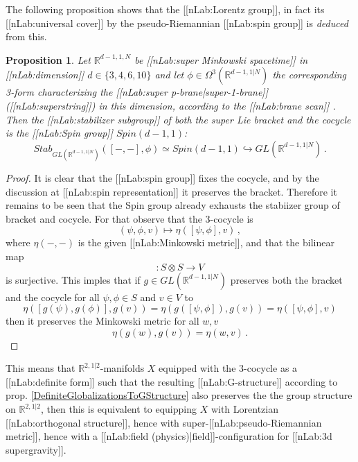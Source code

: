 \documentclass[12pt,titlepage]{article}
\theoremstyle{plain}
\newtheorem{prop}{Proposition}
\theoremstyle{definition}
\theoremstyle{remark}
\begin{document}
The following proposition shows that the [[nLab:Lorentz group]], in fact its [[nLab:universal cover]] by the pseudo-Riemannian [[nLab:spin group]] is \emph{deduced} from this.
\begin{prop}
\label{StabilizerOfSupersymmetryJointWith3Cocycle}\hypertarget{StabilizerOfSupersymmetryJointWith3Cocycle}{}
Let $\mathbb{R}^{d-1,1,N}$ be [[nLab:super Minkowski spacetime]] in [[nLab:dimension]] $d \in \{3,4,6,10\}$ and let $\phi \in \Omega^{3}(\mathbb{R}^{d-1,1|N})$ the corresponding 3-form characterizing the [[nLab:super p-brane|super-1-brane]] ([[nLab:superstring]]) in this dimension, according to the [[nLab:brane scan]] . Then the [[nLab:stabilizer subgroup]] of both the super Lie bracket and the cocycle is the [[nLab:Spin group]] $Spin(d-1,1)$:
\begin{displaymath}
Stab_{GL(\mathbb{R}^{d-1,1|N})}([-,-], \phi)
  \simeq
  Spin(d-1,1) \hookrightarrow GL(\mathbb{R}^{d-1,1|N})
  \,.
\end{displaymath}
\end{prop}
\begin{proof}
It is clear that the [[nLab:spin group]] fixes the cocycle, and by the discussion at [[nLab:spin representation]] it preserves the bracket. Therefore it remains to be seen that the Spin group already exhausts the stabiizer group of bracket and cocycle. For that observe that the 3-cocycle is
\begin{displaymath}
(\psi,\phi, v) \mapsto \eta( [\psi,\phi], v )
  \,,
\end{displaymath}
where $\eta(-,-)$ is the given [[nLab:Minkowski metric]], and that the bilinear map
\begin{displaymath}
[-,-]\colon S \otimes S\to V
\end{displaymath}
is surjective. This imples that if $g \in GL(\mathbb{R}^{d-1,1|N})$ preserves both the bracket and the cocycle for all $\psi, \phi \in S$ and $v \in V$ to
\begin{displaymath}
\eta( [g(\psi),g(\phi)], g(v) )
  =
  \eta( g([\psi,\phi]), g(v) )
  =
  \eta( [\psi,\phi], v )
\end{displaymath}
then it preserves the Minkowski metric for all $w,v$
\begin{displaymath}
\eta(g(w), g(v)) = \eta(w,v)
  \,.
\end{displaymath}
\end{proof}
This means that $\mathbb{R}^{2,1|2}$-manifolds $X$ equipped with the 3-cocycle as a [[nLab:definite form]] such that the resulting [[nLab:G-structure]] according to prop. \ref{DefiniteGlobalizationsToGStructure} also preserves the the group structure on $\mathbb{R}^{2,1|2}$, then this is equivalent to equipping $X$ with Lorentzian [[nLab:orthogonal structure]], hence with super-[[nLab:pseudo-Riemannian metric]], hence with a [[nLab:field (physics)|field]]-configuration for [[nLab:3d supergravity]].
\end{document}
